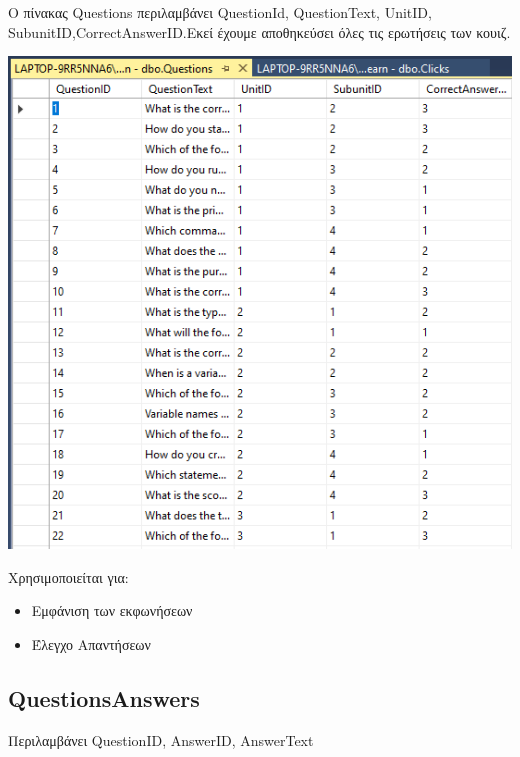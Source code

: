 \documentclass[12pt]{article}
\newcommand{\en}[1]{\foreignlanguage{English}{#1}}
\begin{document}
Ο πίνακας \en{Questions} περιλαμβάνει \en{QuestionId, QuestionText, UnitID,
\newline
 SubunitID,CorrectAnswerID}.Εκεί έχουμε αποθηκεύσει όλες τις ερωτήσεις των κουιζ.
\begin{center}
    \centering
    \includegraphics[width=0.8\linewidth]{questionsdb.png}
\end{center}

Χρησιμοποιείται για:
\begin{itemize}
    \item Εμφάνιση των εκφωνήσεων
    \item Έλεγχο Απαντήσεων
\end{itemize}
\newpage

\subsection*{\en{QuestionsAnswers}}

Περιλαμβάνει \en{QuestionID, AnswerID, AnswerText}
\end{document}
